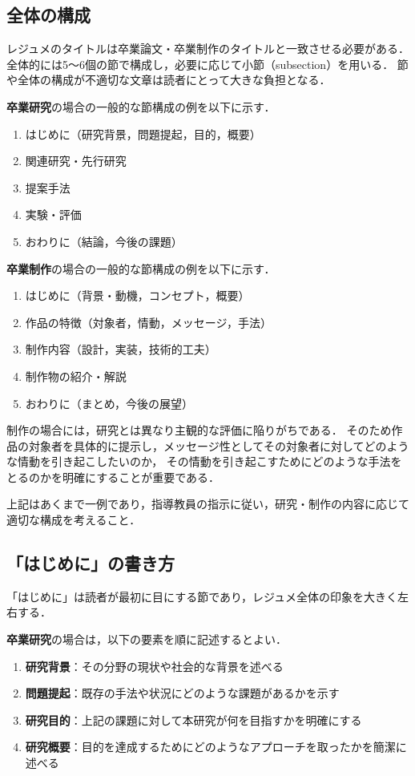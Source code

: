 \subsection{全体の構成}
\label{subsec:structure}
レジュメのタイトルは卒業論文・卒業制作のタイトルと一致させる必要がある．
全体的には5〜6個の節で構成し，必要に応じて小節（subsection）を用いる．
節や全体の構成が不適切な文章は読者にとって大きな負担となる\cite{kisaragi}．

\textbf{卒業研究}の場合の一般的な節構成の例を以下に示す．
\begin{enumerate}
    \item はじめに（研究背景，問題提起，目的，概要）
    \item 関連研究・先行研究
    \item 提案手法
    \item 実験・評価
    \item おわりに（結論，今後の課題）
\end{enumerate}

\textbf{卒業制作}の場合の一般的な節構成の例を以下に示す．
\begin{enumerate}
    \item はじめに（背景・動機，コンセプト，概要）
    \item 作品の特徴（対象者，情動，メッセージ，手法）
    \item 制作内容（設計，実装，技術的工夫）
    \item 制作物の紹介・解説
    \item おわりに（まとめ，今後の展望）
\end{enumerate}
制作の場合には，研究とは異なり主観的な評価に陥りがちである．
そのため作品の対象者を具体的に提示し，メッセージ性としてその対象者に対してどのような情動を引き起こしたいのか，
その情動を引き起こすためにどのような手法をとるのかを明確にすることが重要である．

上記はあくまで一例であり，指導教員の指示に従い，研究・制作の内容に応じて適切な構成を考えること．

\subsection{「はじめに」の書き方}
\label{subsec:intro-writing}
「はじめに」は読者が最初に目にする節であり，レジュメ全体の印象を大きく左右する．

\textbf{卒業研究}の場合は，以下の要素を順に記述するとよい．
\begin{enumerate}
    \item \textbf{研究背景}：その分野の現状や社会的な背景を述べる
    \item \textbf{問題提起}：既存の手法や状況にどのような課題があるかを示す
    \item \textbf{研究目的}：上記の課題に対して本研究が何を目指すかを明確にする
    \item \textbf{研究概要}：目的を達成するためにどのようなアプローチを取ったかを簡潔に述べる
\end{enumerate}

